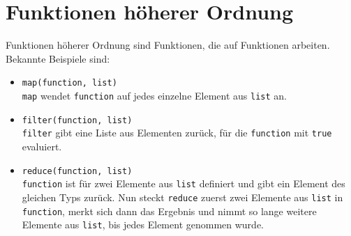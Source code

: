 
\section{Funktionen höherer Ordnung}
Funktionen höherer Ordnung sind Funktionen, die auf Funktionen arbeiten.
Bekannte Beispiele sind:
\begin{itemize}
    \item \texttt{map(function, list)}\\
          \texttt{map} wendet \texttt{function} auf jedes einzelne
          Element aus \texttt{list} an.
    \item \texttt{filter(function, list)}\\
          \texttt{filter} gibt eine Liste aus Elementen zurück, für 
          die \texttt{function} mit \texttt{true} evaluiert.
    \item \texttt{reduce(function, list)}\\
          \texttt{function} ist für zwei Elemente aus \texttt{list}
          definiert und gibt ein Element des gleichen Typs zurück.
          Nun steckt \texttt{reduce} zuerst zwei Elemente aus \texttt{list}
          in \texttt{function}, merkt sich dann das Ergebnis und nimmt
          so lange weitere Elemente aus \texttt{list}, bis jedes 
          Element genommen wurde.
\end{itemize}
